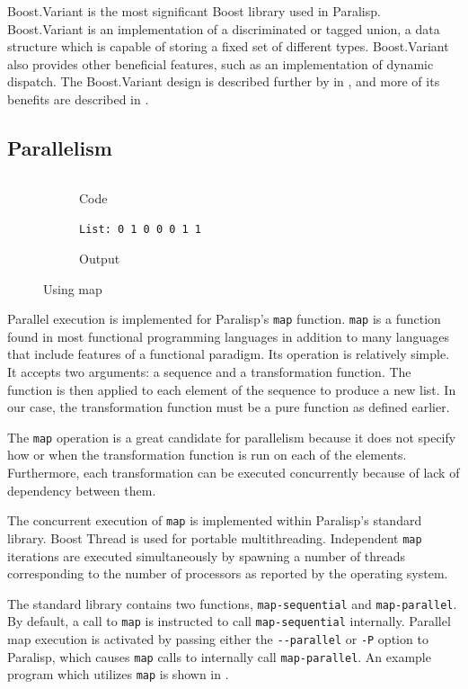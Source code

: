 \documentclass[
abstracton,
fontsize=12pt,
]{scrartcl}
\begin{document}
Boost.Variant is the most significant Boost library used in Paralisp. Boost.Variant is an implementation of a discriminated or tagged union, a data structure which is capable of storing a fixed set of different types. Boost.Variant also provides other beneficial features, such as an implementation of dynamic dispatch. The Boost.Variant design is described further by \citeauthor{boost-variant} in , and more of its benefits are described in .

\subsection{Parallelism}

\begin{figure}
  \begin{subfigure}[b]{0.5\textwidth}
    \centering
    \inputminted{scheme}{code/map-is-positive.scm}
    \caption{Code}
  \end{subfigure}
  \begin{subfigure}[b]{0.5\textwidth}
    \centering
    \verb|List: 0 1 0 0 0 1 1|
    \caption{Output}
  \end{subfigure}
  \caption{Using map}\label{fig:map}
\end{figure}

Parallel execution is implemented for Paralisp's \verb|map| function. \verb|map| is a function found in most functional programming languages in addition to many languages that include features of a functional paradigm. Its operation is relatively simple. It accepts two arguments: a sequence and a transformation function. The function is then applied to each element of the sequence to produce a new list. In our case, the transformation function must be a pure function as defined earlier.

The \verb|map| operation is a great candidate for parallelism because it does not specify how or when the transformation function is run on each of the elements. Furthermore, each transformation can be executed concurrently because of lack of dependency between them.

The concurrent execution of \verb|map| is implemented within Paralisp's standard library. Boost Thread is used for portable multithreading. Independent \verb|map| iterations are executed simultaneously by spawning a number of threads corresponding to the number of processors as reported by the operating system.

The standard library contains two functions, \verb|map-sequential| and \verb|map-parallel|. By default, a call to \verb|map| is instructed to call \verb|map-sequential| internally. Parallel map execution is activated by passing either the \verb|--parallel| or \verb|-P| option to Paralisp, which causes \verb|map| calls to internally call \verb|map-parallel|. An example program which utilizes \verb|map| is shown in .
\end{document}
